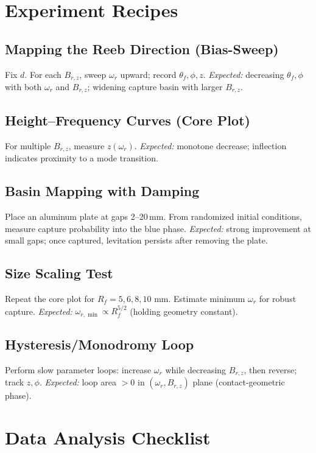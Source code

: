 \documentclass[11pt]{article}
\theoremstyle{definition}
\theoremstyle{plain}
\begin{document}
\section{Experiment Recipes}

\subsection{Mapping the Reeb Direction (Bias-Sweep)}
Fix \(d\). For each \(B_{r,z}\), sweep \(\omega_r\) upward; record \(\theta_f,\phi,z\).
\emph{Expected:} decreasing \(\theta_f,\phi\) with both \(\omega_r\) and \(B_{r,z}\); widening capture basin with larger \(B_{r,z}\).

\subsection{Height--Frequency Curves (Core Plot)}
For multiple \(B_{r,z}\), measure \(z(\omega_r)\).
\emph{Expected:} monotone decrease; inflection indicates proximity to a mode transition.

\subsection{Basin Mapping with Damping}
Place an aluminum plate at gaps 2--20\,mm. From randomized initial conditions, measure capture probability into the blue phase.
\emph{Expected:} strong improvement at small gaps; once captured, levitation persists after removing the plate.

\subsection{Size Scaling Test}
Repeat the core plot for \(R_f=5,6,8,10\) mm. Estimate minimum \(\omega_r\) for robust capture.
\emph{Expected:} \(\omega_{r,\min}\propto R_f^{5/2}\) (holding geometry constant).

\subsection{Hysteresis/Monodromy Loop}
Perform slow parameter loops: increase \(\omega_r\) while decreasing \(B_{r,z}\), then reverse; track \(z,\phi\).
\emph{Expected:} loop area \(>0\) in \((\omega_r,B_{r,z})\) plane (contact-geometric phase).

\section{Data Analysis Checklist}
\end{document}
